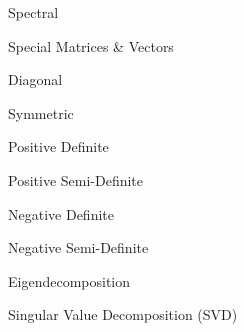\documentclass[11pt]{article}
\begin{document}
\begin{enumerate}
\begin{item}
\begin{enumerate}
\begin{item}
\begin{enumerate}
                \begin{item}
                  Spectral
                \end{item}

            \end{enumerate}

          \end{item}

          \begin{item}

            Special Matrices \& Vectors

            \begin{enumerate}

                \begin{item}
                  Diagonal
                \end{item}

                \begin{item}
                  Symmetric
                \end{item}

                \begin{item}
                  Positive Definite 
                \end{item}

                \begin{item}
                  Positive Semi-Definite 
                \end{item}

                \begin{item}
                  Negative Definite 
                \end{item}

                \begin{item}
                  Negative Semi-Definite 
                \end{item}

            \end{enumerate}

          \end{item}

          \begin{item}

            Eigendecomposition

          \end{item}

          \begin{item}
            Singular Value Decomposition (SVD)
          \end{item}


\end{enumerate}
\end{item}
\end{enumerate}
\end{document}
